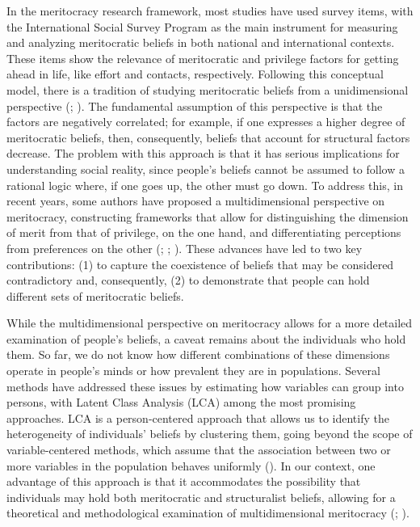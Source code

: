 \documentclass[
  spanish,
  a4paper,
  oneside]{scrbook}
\begin{document}
In the meritocracy research framework, most studies have used survey
items, with the International Social Survey Program as the main
instrument for measuring and analyzing meritocratic beliefs in both
national and international contexts. These items show the relevance of
meritocratic and privilege factors for getting ahead in life, like
effort and contacts, respectively. Following this conceptual model,
there is a tradition of studying meritocratic beliefs from a
unidimensional perspective
(; ). The fundamental
assumption of this perspective is that the factors are negatively
correlated; for example, if one expresses a higher degree of
meritocratic beliefs, then, consequently, beliefs that account for
structural factors decrease. The problem with this approach is that it
has serious implications for understanding social reality, since
people's beliefs cannot be assumed to follow a rational logic where, if
one goes up, the other must go down. To address this, in recent years,
some authors have proposed a multidimensional perspective on
meritocracy, constructing frameworks that allow for distinguishing the
dimension of merit from that of privilege, on the one hand, and
differentiating perceptions from preferences on the other
(;
;
). These advances have
led to two key contributions: (1) to capture the coexistence of beliefs
that may be considered contradictory and, consequently, (2) to
demonstrate that people can hold different sets of meritocratic beliefs.

While the multidimensional perspective on meritocracy allows for a more
detailed examination of people's beliefs, a caveat remains about the
individuals who hold them. So far, we do not know how different
combinations of these dimensions operate in people's minds or how
prevalent they are in populations. Several methods have addressed these
issues by estimating how variables can group into persons, with Latent
Class Analysis (LCA) among the most promising approaches. LCA is a
person-centered approach that allows us to identify the heterogeneity of
individuals' beliefs by clustering them, going beyond the scope of
variable-centered methods, which assume that the association between two
or more variables in the population behaves uniformly
(). In our
context, one advantage of this approach is that it accommodates the
possibility that individuals may hold both meritocratic and
structuralist beliefs, allowing for a theoretical and methodological
examination of multidimensional meritocracy
(;
).
\end{document}
